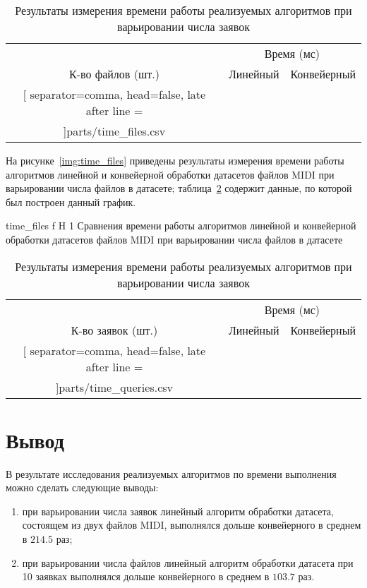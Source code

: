 \begin{table}[H]
	\centering
	\caption{Результаты измерения времени работы реализуемых алгоритмов при варьировании числа заявок}
	\label{tbl:time_queries}
	\begin{tabular}{|c|r|r|}
		\hline
		~ & \multicolumn{2}{c|}{Время (мс)} \\
		\cline{2-3}
		К-во файлов (шт.) & Линейный & Конвейерный \\ \hline
		\csvreader[
		separator=comma,
		head=false,
		late after line = \\\hline
		]{parts/time_files.csv}{}{%
			\csvcoli & \csvcolii & \csvcoliii  
		}
	\end{tabular}
\end{table}

На рисунке~\ref{img:time_files} приведены результаты измерения времени работы алгоритмов линейной и конвейерной обработки датасетов файлов MIDI при варьировании числа файлов в датасете; таблица~\ref{tbl:time_files} содержит данные, по которой был построен данный график.

	{time_files}
	{f}
	{H}
	{1\textwidth}
	{Сравнения времени работы алгоритмов линейной и конвейерной обработки датасетов файлов MIDI при варьировании числа файлов в датасете}
	
\begin{table}[H]
	\centering
	\caption{Результаты измерения времени работы реализуемых алгоритмов при варьировании числа заявок}
	\label{tbl:time_files}
	\begin{tabular}{|c|r|r|}
		\hline
		~ & \multicolumn{2}{c|}{Время (мс)} \\
		\cline{2-3}
		К-во заявок (шт.) & Линейный & Конвейерный \\ \hline
		\csvreader[
		separator=comma,
		head=false,
		late after line = \\\hline
		]{parts/time_queries.csv}{}{%
			\csvcoli & \csvcolii & \csvcoliii  
		}
	\end{tabular}
\end{table}

\section{Вывод}

В результате исследования реализуемых алгоритмов по времени выполнения можно сделать следующие выводы:
\begin{enumerate}
	\item при варьировании числа заявок линейный алгоритм обработки датасета, состоящем из двух файлов MIDI, выполнялся дольше конвейерного в среднем в $214.5$ раз;
	\item при варьировании числа файлов линейный алгоритм обработки датасета при 10 заявках выполнялся дольше конвейерного в среднем в $103.7$ раз.
\end{enumerate}
